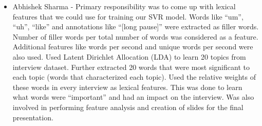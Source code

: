 \documentclass[11pt]{article}
\begin{document}
\begin{itemize}
 \item Abhishek Sharma - Primary responsibility was to come up with lexical features that we could use for training our SVR model. Words like “um”, “uh”, “like” and annotations like “[long pause]” were extracted as filler words. Number of filler words per total number of words was considered as a feature. Additional features like words per second and unique words per second were also used. Used Latent Dirichlet Allocation (LDA) to learn 20 topics from interview dataset. Further extracted 20 words that were most significant to each topic (words that characterized each topic). Used the relative weights of these words in every interview as lexical features. This was done to learn what words were “important” and had an impact on the interview. Was also involved in performing feature analysis and creation of slides for the final presentation.
\end{itemize}



\end{document}

